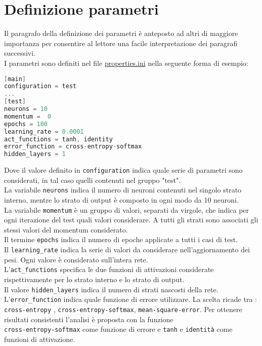 \section{Definizione parametri}
Il paragrafo della definizione dei parametri è anteposto ad altri di maggiore importanza per consentire al lettore una facile interpretazione dei paragrafi successivi. \\
I parametri sono definiti nel file \underline{properties.ini} nella seguente forma di esempio:
\begin{lstlisting}[language=C]
[main]
configuration = test
...
[test]
neurons = 10
momentum =  0
epochs = 100
learning_rate = 0.0001
act_functions = tanh, identity
error_function = cross-entropy-softmax
hidden_layers = 1
\end{lstlisting}
Dove il valore definito in \texttt{configuration} indica quale serie di parametri sono considerati, in tal caso quelli contenuti nel gruppo "test". \\
La variabile \texttt{neurons} indica il numero di neuroni contenuti nel singolo strato interno, mentre lo strato di output è composto in ogni modo da 10 neuroni.\\
La variabile \texttt{momentum} è un gruppo di valori, separati da virgole, che indica per ogni iterazione del test quali valori considerare. A tutti gli strati sono associati gli stessi valori del momentum considerato. \\
Il termine \texttt{epochs} indica il numero di epoche applicate a tutti i casi di test. \\
Il \texttt{learning\_rate} indica la serie di valori da considerare nell'aggiornamento dei pesi. Ogni valore è considerato sull'intera rete. \\
L'\texttt{act\_functions} specifica le due funzioni di attivazioni considerate rispettivamente per lo strato interno e lo strato di output. \\
Il valore \texttt{hidden\_layers} indica il numero di strati nascosti della rete.
L'\texttt{error\_function} indica quale funzione di errore utilizzare. La scelta ricade tra : \texttt{cross-entropy} , \texttt{cross-entropy-softmax}, \texttt{mean-square-error}. Per ottenere risultati consistenti l'analisi è proposta con la funzione  \\ \texttt{cross-}\texttt{entropy-}\texttt{softmax} come funzione di errore e \texttt{tanh} e \texttt{identità} come funzioni di attivazione.

